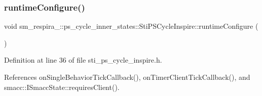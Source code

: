 \subsubsection{\texorpdfstring{runtime\+Configure()}{runtimeConfigure()}}
{\footnotesize\ttfamily void sm\+\_\+respira\+\_\+::ps\+\_\+cycle\+\_\+inner\+\_\+states\+::\+Sti\+P\+S\+Cycle\+Inspire\+::runtime\+Configure (\begin{DoxyParamCaption}{ }\end{DoxyParamCaption})\hspace{0.3cm}{\ttfamily [inline]}}



Definition at line 36 of file sti\+\_\+ps\+\_\+cycle\+\_\+inspire.\+h.



References on\+Single\+Behavior\+Tick\+Callback(), on\+Timer\+Client\+Tick\+Callback(), and smacc\+::\+I\+Smacc\+State\+::requires\+Client().


